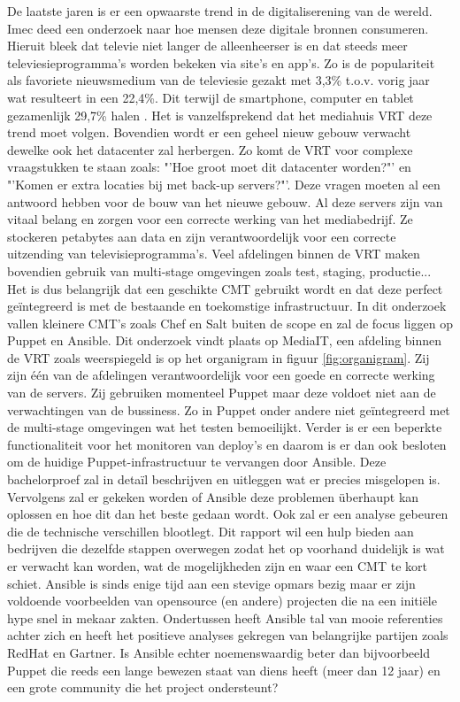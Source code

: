 De laatste jaren is er een opwaarste trend in de digitaliserening van de wereld. Imec deed een onderzoek naar hoe mensen deze digitale bronnen consumeren. Hieruit bleek dat televie niet langer de alleenheerser is en dat steeds meer televiesieprogramma's worden bekeken via site's en app's. Zo is de populariteit als favoriete nieuwsmedium van de televiesie gezakt met 3,3\% t.o.v. vorig jaar wat resulteert in een 22,4\%. Dit terwijl de smartphone, computer en tablet gezamenlijk 29,7\% halen \autocite{digimeter}. Het is vanzelfsprekend dat het mediahuis VRT deze trend moet volgen.
Bovendien wordt er een geheel nieuw gebouw verwacht dewelke ook het datacenter zal herbergen. Zo komt de VRT voor complexe vraagstukken te staan zoals: "'Hoe groot moet dit datacenter worden?"'  en "'Komen er extra locaties bij met back-up servers?"'.  Deze vragen moeten al een antwoord hebben voor de bouw van het nieuwe gebouw. \newline
Al deze servers zijn van vitaal belang en zorgen voor een correcte werking van het mediabedrijf. Ze stockeren petabytes aan data en zijn verantwoordelijk voor een correcte uitzending van televisieprogramma's. Veel afdelingen binnen de VRT maken bovendien gebruik van multi-stage omgevingen zoals test, staging, productie... Het is dus belangrijk dat een geschikte CMT gebruikt wordt en dat deze perfect ge\"integreerd is met de bestaande en toekomstige infrastructuur.
In dit onderzoek vallen kleinere CMT's zoals Chef en Salt buiten de scope en zal de focus liggen op Puppet en Ansible. Dit onderzoek vindt plaats op MediaIT, een afdeling binnen de VRT zoals weerspiegeld is op het organigram in figuur \ref{fig:organigram}. Zij zijn \'e\'en van de afdelingen verantwoordelijk voor een goede en correcte werking van de servers. Zij gebruiken momenteel Puppet maar deze voldoet niet aan de verwachtingen van de bussiness. Zo in Puppet onder andere niet ge\"integreerd met de multi-stage omgevingen wat het testen bemoeilijkt. Verder is er een beperkte functionaliteit voor het monitoren van deploy's en daarom is er dan ook besloten om de huidige Puppet-infrastructuur te vervangen door Ansible.
\newline
Deze bachelorproef zal in deta\"il beschrijven en uitleggen wat er precies misgelopen is. Vervolgens zal er gekeken worden of Ansible deze problemen \"uberhaupt kan oplossen en hoe dit dan het beste gedaan wordt. Ook zal er een analyse gebeuren die de technische verschillen blootlegt.  Dit rapport wil een hulp bieden aan bedrijven die dezelfde stappen overwegen zodat het op voorhand duidelijk is wat er verwacht kan worden, wat de mogelijkheden zijn en waar een CMT te kort schiet. Ansible is sinds enige tijd aan een stevige opmars bezig maar er zijn voldoende voorbeelden van opensource (en andere) projecten die na een initi\"ele hype snel in mekaar zakten. Ondertussen heeft Ansible tal van mooie referenties achter zich en heeft het positieve analyses gekregen van belangrijke partijen zoals RedHat en Gartner. Is Ansible echter noemenswaardig beter dan bijvoorbeeld Puppet die reeds een lange bewezen staat van diens heeft (meer dan 12 jaar) en een grote community die het project ondersteunt?

